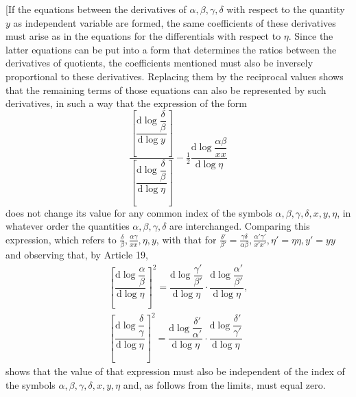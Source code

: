 \begingroup
\renewcommand{\arraystretch}{1.45}

[If the equations between the derivatives of $\alpha,\allowbreak \beta,\allowbreak \gamma,\allowbreak \delta$ with respect to the quantity $y$ as independent variable are formed, the same coefficients of these derivatives must arise as in the equations for the differentials with respect to $\eta$. Since the latter equations can be put into a form that determines the ratios between the derivatives of quotients, the coefficients mentioned must also be inversely proportional to these derivatives. Replacing them by the reciprocal values shows that the remaining terms of those equations can also be represented by such derivatives, in such a way that the expression of the form
\[
\dfrac{\left[\dfrac{\mathrm{d}\log\dfrac{\delta}{\beta}}{\mathrm{d}\log y}\right]}
{\left[\dfrac{\mathrm{d}\log\dfrac{\delta}{\beta}}{\mathrm{d}\log\eta}\right]}
-\tfrac12\dfrac{\mathrm{d}\log\dfrac{\alpha\beta}{xx}}{\mathrm{d}\log\eta}
\]
does not change its value for any common index of the symbols $\alpha,\allowbreak \beta,\allowbreak \gamma,\allowbreak \delta,\allowbreak x,\allowbreak y,\allowbreak \eta$, in whatever order the quantities $\alpha,\allowbreak \beta,\allowbreak \gamma,\allowbreak \delta$ are interchanged. Comparing this expression, which refers to $\frac{\delta}{\beta},\allowbreak \frac{\alpha\gamma}{xx},\allowbreak \eta,\allowbreak y$, with that for $\frac{\delta'}{\beta'}=\frac{\gamma\delta}{\alpha\beta},\allowbreak \frac{\alpha'\gamma'}{x'x'},\allowbreak \eta'=\eta\eta,\allowbreak y'=yy$ and observing that, by Article 19,
\[
\begin{gathered}\left[\dfrac{\mathrm{d}\log\dfrac{\alpha}{\beta}}{\mathrm{d}\log\eta}\right]^2
=\dfrac{\mathrm{d}\log\dfrac{\gamma'}{\beta'}}{\mathrm{d}\log\eta}\cdot
\dfrac{\mathrm{d}\log\dfrac{\alpha'}{\beta'}}{\mathrm{d}\log\eta},\\[9pt]
\left[\dfrac{\mathrm{d}\log\dfrac{\delta}{\gamma}}{\mathrm{d}\log\eta}\right]^2
=\dfrac{\mathrm{d}\log\dfrac{\delta'}{\alpha'}}{\mathrm{d}\log\eta}\cdot
\dfrac{\mathrm{d}\log\dfrac{\delta'}{\gamma'}}{\mathrm{d}\log\eta}\end{gathered}
\]
shows that the value of that expression must also be independent of the index of the symbols $\alpha,\allowbreak \beta,\allowbreak \gamma,\allowbreak \delta,\allowbreak x,\allowbreak y,\allowbreak \eta$ and, as follows from the limits, must equal zero.

